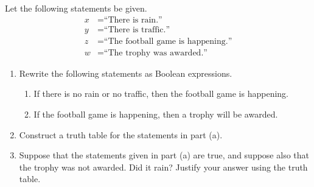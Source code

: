 \documentclass{article}
\theoremstyle{definition}
\begin{document}
\begin{question}
	Let the following statements be given.
		\begin{align*}
		x &= \text{``There is rain.''}\\
		y &= \text{``There is traffic.''}\\
		z &= \text{``The football game is happening.''}\\
		w &= \text{``The trophy was awarded.''}
		\end{align*}
	\begin{enumerate}
		\item Rewrite the following statements as Boolean expressions.
			\begin{enumerate}
			\item If there is no rain or no traffic, then the football game is happening.
			\item If the football game is happening, then a trophy will be awarded.
			\end{enumerate}
		\item Construct a truth table for the statements in part (a).
		\item Suppose that the statements given in part (a) are true, and suppose also that the trophy was not awarded. Did it rain? Justify your answer using the truth table.
	\end{enumerate}
\end{question}
\begin{solution}
\end{solution}
\end{document}
